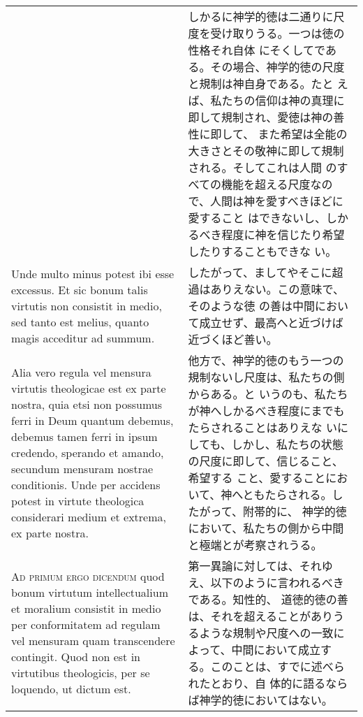 \documentclass[10pt]{jsarticle}
\begin{document}
\begin{longtable}{p{21em}p{21em}}
 
&

 しかるに神学的徳は二通りに尺度を受け取りうる。一つは徳の性格それ自体
 にそくしてである。その場合、神学的徳の尺度と規制は神自身である。たと
 えば、私たちの信仰は神の真理に即して規制され、愛徳は神の善性に即して、
 また希望は全能の大きさとその敬神に即して規制される。そしてこれは人間
 のすべての機能を超える尺度なので、人間は神を愛すべきほどに愛すること
 はできないし、しかるべき程度に神を信じたり希望したりすることもできな
 い。

\\


Unde multo minus potest ibi esse excessus. Et sic bonum talis virtutis
non consistit in medio, sed tanto est melius, quanto magis acceditur
 ad summum.


&

 したがって、ましてやそこに超過はありえない。この意味で、そのような徳
 の善は中間において成立せず、最高へと近づけば近づくほど善い。

\\



 Alia vero regula vel mensura virtutis theologicae est ex
parte nostra, quia etsi non possumus ferri in Deum quantum debemus,
debemus tamen ferri in ipsum credendo, sperando et amando, secundum
mensuram nostrae conditionis. Unde per accidens potest in virtute
theologica considerari medium et extrema, ex parte nostra.

&

 他方で、神学的徳のもう一つの規制ないし尺度は、私たちの側からある。と
 いうのも、私たちが神へしかるべき程度にまでもたらされることはありえな
 いにしても、しかし、私たちの状態の尺度に即して、信じること、希望する
 こと、愛することにおいて、神へともたらされる。したがって、附帯的に、
 神学的徳において、私たちの側から中間と極端とが考察されうる。

\\

 {\scshape Ad primum ergo dicendum} quod bonum virtutum
 intellectualium et moralium consistit in medio per conformitatem ad
 regulam vel mensuram quam transcendere contingit. Quod non est in
 virtutibus theologicis, per se loquendo, ut dictum est.
 
&

 第一異論に対しては、それゆえ、以下のように言われるべきである。知性的、
 道徳的徳の善は、それを超えることがありうるような規制や尺度への一致に
 よって、中間において成立する。このことは、すでに述べられたとおり、自
 体的に語るならば神学的徳においてはない。
 


\end{longtable}
\end{document}
